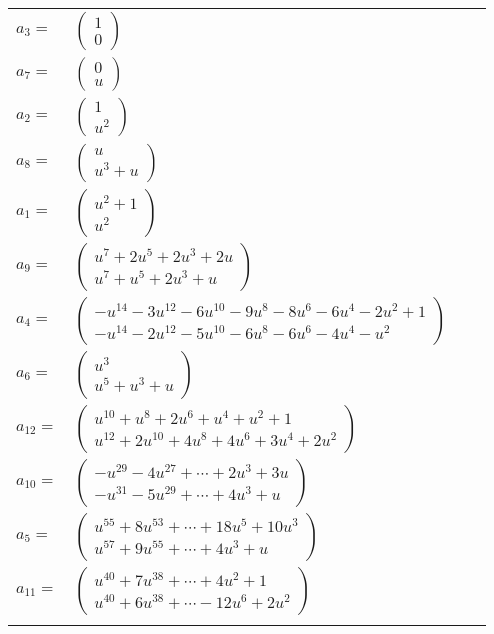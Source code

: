 \documentclass[1p]{elsarticle_modified}
\theoremstyle{definition}
\begin{document}
\begin{tabular}{m{7pt} m{180pt} m{7pt} m{180pt} }
\flushright $a_{3}=$&$\begin{pmatrix}1\\0\end{pmatrix}$ \\
\flushright $a_{7}=$&$\begin{pmatrix}0\\u\end{pmatrix}$ \\
\flushright $a_{2}=$&$\begin{pmatrix}1\\u^2\end{pmatrix}$ \\
\flushright $a_{8}=$&$\begin{pmatrix}u\\u^3+u\end{pmatrix}$ \\
\flushright $a_{1}=$&$\begin{pmatrix}u^2+1\\u^2\end{pmatrix}$ \\
\flushright $a_{9}=$&$\begin{pmatrix}u^7+2 u^5+2 u^3+2 u\\u^7+u^5+2 u^3+u\end{pmatrix}$ \\
\flushright $a_{4}=$&$\begin{pmatrix}- u^{14}-3 u^{12}-6 u^{10}-9 u^8-8 u^6-6 u^4-2 u^2+1\\- u^{14}-2 u^{12}-5 u^{10}-6 u^8-6 u^6-4 u^4- u^2\end{pmatrix}$ \\
\flushright $a_{6}=$&$\begin{pmatrix}u^3\\u^5+u^3+u\end{pmatrix}$ \\
\flushright $a_{12}=$&$\begin{pmatrix}u^{10}+u^8+2 u^6+u^4+u^2+1\\u^{12}+2 u^{10}+4 u^8+4 u^6+3 u^4+2 u^2\end{pmatrix}$ \\
\flushright $a_{10}=$&$\begin{pmatrix}- u^{29}-4 u^{27}+\cdots+2 u^3+3 u\\- u^{31}-5 u^{29}+\cdots+4 u^3+u\end{pmatrix}$ \\
\flushright $a_{5}=$&$\begin{pmatrix}u^{55}+8 u^{53}+\cdots+18 u^5+10 u^3\\u^{57}+9 u^{55}+\cdots+4 u^3+u\end{pmatrix}$ \\
\flushright $a_{11}=$&$\begin{pmatrix}u^{40}+7 u^{38}+\cdots+4 u^2+1\\u^{40}+6 u^{38}+\cdots-12 u^6+2 u^2\end{pmatrix}$\\&\end{tabular}
\end{document}
